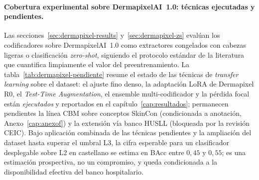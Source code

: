 \paragraph{Cobertura experimental sobre DermapixelAI~1.0: técnicas
ejecutadas y pendientes.}
\label{sec:dermapixel-futuro}
Las secciones~\ref{sec:dermapixel-results} y~\ref{sec:dermapixel-zs}
evalúan los codificadores sobre DermapixelAI~1.0 como extractores
congelados con cabezas ligeras o clasificación \emph{zero-shot}, siguiendo
el protocolo estándar de la literatura que cuantifica limpiamente el valor
del preentrenamiento. La tabla~\ref{tab:dermapixel-pendiente} resume el
estado de las técnicas de \emph{transfer learning} sobre el dataset: el
ajuste fino denso, la adaptación LoRA de Dermapixel R0, el \emph{Test-Time
Augmentation}, el ensemble multi-codificador y la pérdida focal están
\emph{ejecutados} y reportados en el capítulo~\ref{cap:resultados};
permanecen pendientes la línea CBM sobre conceptos SkinCon (condicionada a
anotación, Anexo~\ref{cap:anexof}) y la extensión vía banco HUSLL
(bloqueada por la revisión CEIC). Bajo aplicación combinada de las
técnicas pendientes y la ampliación del dataset hasta superar el umbral
L3, la cifra esperable para un clasificador desplegable sobre L2 en
castellano se estima en BAcc entre $0{,}45$ y $0{,}55$; es una estimación
prospectiva, no un compromiso, y queda condicionada a la disponibilidad
efectiva del banco hospitalario.

